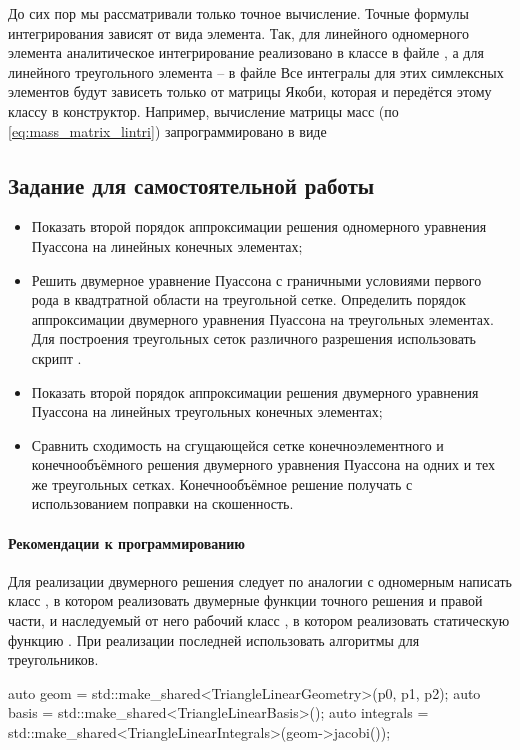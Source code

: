 До сих пор мы рассматривали только точное вычисление.
Точные формулы интегрирования зависят
от вида элемента. Так, для линейного одномерного элемента
аналитическое интегрирование реализовано в классе
 в файле ,
а для линейного треугольного элемента -- 
 в файле 
Все интегралы для этих симлексных элементов будут зависеть только от матрицы Якоби, которая и передётся этому классу в конструктор.
Например, вычисление матрицы масс (по \cref{eq:mass_matrix_lintri}) запрограммировано в виде

\subsection{Задание для самостоятельной работы}
\begin{itemize}
\item
Показать второй порядок аппроксимации решения одномерного уравнения Пуассона
на линейных конечных элементах;
\item
Решить двумерное уравнение Пуассона с граничными условиями первого рода в квадтратной области на треугольной сетке.
Определить порядок аппроксимации двумерного уравнения Пуассона на треугольных элементах.
Для построения треугольных сеток различного разрешения использовать
скрипт .
\item
Показать второй порядок аппроксимации решения двумерного уравнения Пуассона
на линейных треугольных конечных элементах;
\item
Сравнить сходимость на сгущающейся сетке конечноэлементного и конечнообъёмного решения
двумерного уравнения Пуассона на одних и тех же треугольных сетках.
Конечнообъёмное решение получать с использованием поправки на скошенность.
\end{itemize}

\paragraph{Рекомендации к программированию}
Для реализации двумерного решения
следует по аналогии с одномерным написать класс
,
в котором реализовать двумерные функции точного решения и правой части,
и наследуемый от него рабочий класс 
,
в котором реализовать статическую функцию .
При реализации последней
использовать
алгоритмы для треугольников.
\begin{cppcode}
auto geom = std::make_shared<TriangleLinearGeometry>(p0, p1, p2);
auto basis = std::make_shared<TriangleLinearBasis>();
auto integrals = std::make_shared<TriangleLinearIntegrals>(geom->jacobi({}));
\end{cppcode}
